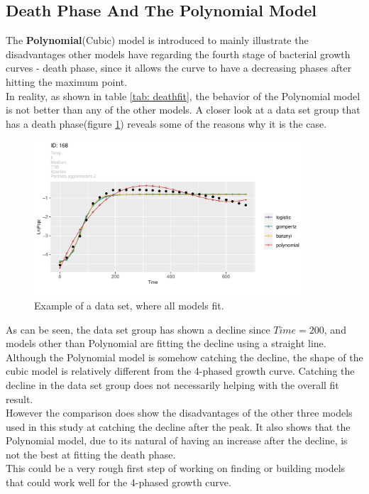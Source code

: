 \documentclass[11pt]{article}
\begin{document}
\subsection{Death Phase And The Polynomial Model}
The \textbf{Polynomial}(Cubic) model is introduced to mainly illustrate the disadvantages other models have regarding the fourth stage of bacterial growth curves - death phase, since it allows the curve to have a decreasing phases after hitting the maximum point.\\
In reality, as shown in table \ref{tab: deathfit}, the behavior of the Polynomial model is not better than any of the other models. A closer look at a data set group that has a death phase(figure \ref{fig:deathphasedata}) reveals some of the reasons why it is the case. 
\FloatBarrier
\begin{figure}[!htbp]
    \centering
    \includegraphics[width=0.9\textwidth]{../Results/allPlots/ 168 .pdf}
    \caption{Example of a data set, where all models fit.}
    \label{fig:deathphasedata}
\end{figure}
\FloatBarrier
As can be seen, the data set group has shown a decline since $Time=200$, and models other than Polynomial are fitting the decline using a straight line. Although the Polynomial model is somehow catching the decline, the shape of the cubic model is relatively different from the 4-phased growth curve. Catching the decline in the data set group does not necessarily helping with the overall fit result.\\
However the comparison does show the disadvantages of the other three models used in this study at catching the decline after the peak. It also shows that the Polynomial model, due to its natural of having an increase after the decline, is not the best at fitting the death phase.\\
This could be a very rough first step of working on finding or building models that could work well for the 4-phased growth curve.
\clearpage

\printbibliography
\end{document}
